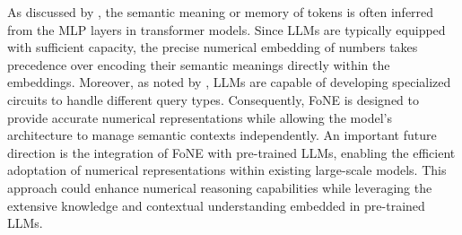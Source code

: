 As discussed by \citet{meng2022locating}, the semantic meaning or memory of tokens is often inferred from the MLP layers in transformer models. Since LLMs are typically equipped with sufficient capacity, the precise numerical embedding of numbers takes precedence over encoding their semantic meanings directly within the embeddings. Moreover, as noted by \citet{yao2024knowledge}, LLMs are capable of developing specialized circuits to handle different query types. Consequently, FoNE is designed to provide accurate numerical representations while allowing the model's architecture to manage semantic contexts independently. An important future direction is the integration of FoNE with pre-trained LLMs, enabling the efficient adoptation of numerical representations within existing large-scale models. This approach could enhance numerical reasoning capabilities while leveraging the extensive knowledge and contextual understanding embedded in pre-trained LLMs.

